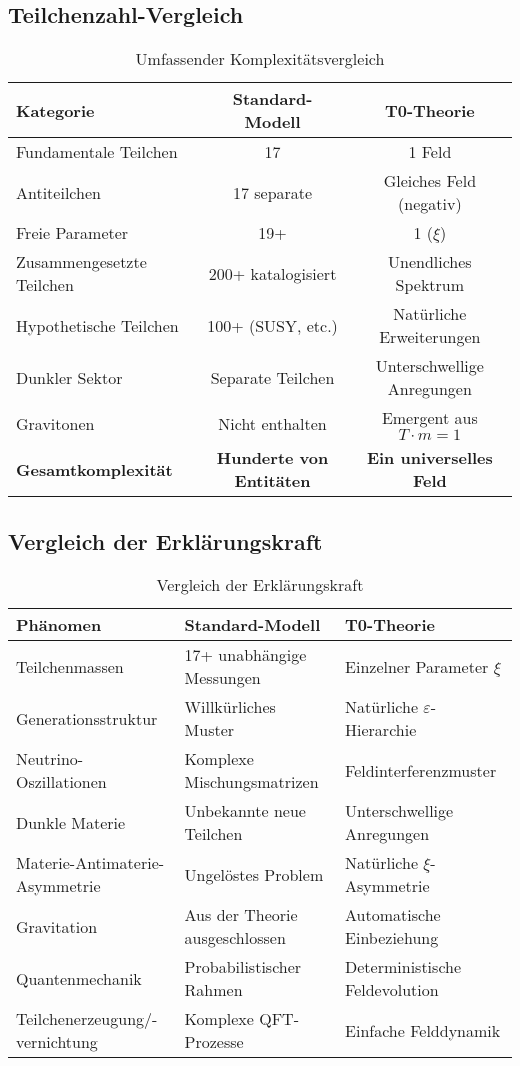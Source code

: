 \documentclass[12pt,a4paper]{article}
\newcommand{\xipar}{\xi}
\begin{document}
	\subsection{Teilchenzahl-Vergleich}
	
	\begin{table}[htbp]
		\centering
		\begin{tabular}{|l|c|c|}
			\hline
			\textbf{Kategorie} & \textbf{Standard-Modell} & \textbf{T0-Theorie} \\
			\hline
			\hline
			Fundamentale Teilchen & 17 & 1 Feld \\
			Antiteilchen & 17 separate & Gleiches Feld (negativ) \\
			Freie Parameter & 19+ & 1 ($\xipar$) \\
			Zusammengesetzte Teilchen & 200+ katalogisiert & Unendliches Spektrum \\
			Hypothetische Teilchen & 100+ (SUSY, etc.) & Natürliche Erweiterungen \\
			Dunkler Sektor & Separate Teilchen & Unterschwellige Anregungen \\
			Gravitonen & Nicht enthalten & Emergent aus $T \cdot m = 1$ \\
			\hline
			\textbf{Gesamtkomplexität} & \textbf{Hunderte von Entitäten} & \textbf{Ein universelles Feld} \\
			\hline
		\end{tabular}
		\caption{Umfassender Komplexitätsvergleich}
		\label{tab:complexity_comparison}
	\end{table}
	
	\subsection{Vergleich der Erklärungskraft}
	
	\begin{table}[htbp]
		\centering
		\begin{tabular}{|p{4cm}|p{5cm}|p{5cm}|}
			\hline
			\textbf{Phänomen} & \textbf{Standard-Modell} & \textbf{T0-Theorie} \\
			\hline
			\hline
			Teilchenmassen & 17+ unabhängige Messungen & Einzelner Parameter $\xipar$ \\
			Generationsstruktur & Willkürliches Muster & Natürliche $\varepsilon$-Hierarchie \\
			Neutrino-Oszillationen & Komplexe Mischungsmatrizen & Feldinterferenzmuster \\
			Dunkle Materie & Unbekannte neue Teilchen & Unterschwellige Anregungen \\
			Materie-Antimaterie-Asymmetrie & Ungelöstes Problem & Natürliche $\xipar$-Asymmetrie \\
			Gravitation & Aus der Theorie ausgeschlossen & Automatische Einbeziehung \\
			Quantenmechanik & Probabilistischer Rahmen & Deterministische Feldevolution \\
			Teilchenerzeugung/-vernichtung & Komplexe QFT-Prozesse & Einfache Felddynamik \\
			\hline
		\end{tabular}
		\caption{Vergleich der Erklärungskraft}
		\label{tab:explanatory_comparison}
	\end{table}
	
\end{document}
